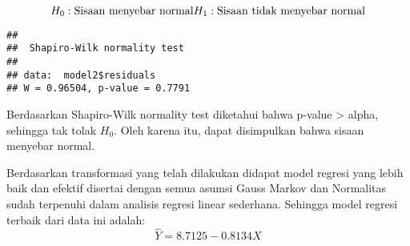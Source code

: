 \documentclass[
]{article}
\newenvironment{Shaded}{\begin{snugshade}}{\end{snugshade}}
\newcommand{\FunctionTok}[1]{\textcolor[rgb]{0.13,0.29,0.53}{\textbf{#1}}}
\newcommand{\NormalTok}[1]{#1}
\newcommand{\SpecialCharTok}[1]{\textcolor[rgb]{0.81,0.36,0.00}{\textbf{#1}}}
\begin{document}
\[ H_0 : \text{Sisaan menyebar normal}\\H_1 : \text{Sisaan tidak menyebar normal} \]

\begin{Shaded}
\end{Shaded}

\begin{verbatim}
## 
##  Shapiro-Wilk normality test
## 
## data:  model2$residuals
## W = 0.96504, p-value = 0.7791
\end{verbatim}

Berdasarkan Shapiro-Wilk normality test diketahui bahwa p-value
\textgreater{} alpha, sehingga tak tolak \(H_0\). Oleh karena itu, dapat
disimpulkan bahwa sisaan menyebar normal.

Berdasarkan transformasi yang telah dilakukan didapat model regresi yang
lebih baik dan efektif disertai dengan semua asumsi Gauss Markov dan
Normalitas sudah terpenuhi dalam analisis regresi linear sederhana.
Sehingga model regresi terbaik dari data ini adalah:
\[\hat Y = 8.7125-0.8134X\]
\end{document}
